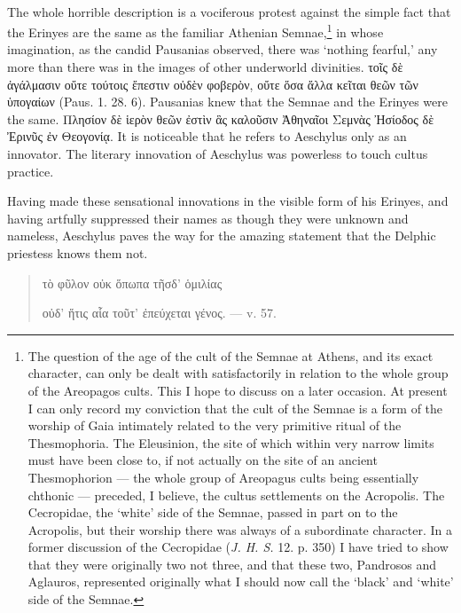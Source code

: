 \documentclass[a4paper, 11pt, oneside, polutonikogreek, english]{article}
\begin{document}
\paragraph{}
The whole horrible description is a vociferous protest against the simple fact that the Erinyes are the same as the familiar Athenian Semnae,\footnote{The question of the age of the cult of the Semnae at Athens, and its exact character, can only be dealt with satisfactorily in relation to the whole group of the Areopagos cults. This I hope to discuss on a later occasion. At present I can only record my conviction that the cult of the Semnae is a form of the worship of Gaia intimately related to the very primitive ritual of the Thesmophoria. The Eleusinion, the site of which within very narrow limits must have been close to, if not actually on the site of an ancient Thesmophorion --- the whole group of Areopagus cults being essentially chthonic --- preceded, I believe, the cultus settlements on the Acropolis. The Cecropidae, the `white' side of the Semnae, passed in part on to the Acropolis, but their worship there was always of a subordinate character. In a former discussion of the Cecropidae (\emph{J. H. S.} 12. p. 350) I have tried to show that they were originally two not three, and that these two, Pandrosos and Aglauros, represented originally what I should now call the `black' and `white' side of the Semnae.} in whose imagination, as the candid Pausanias observed, there was `nothing fearful,' any more than there was in the images of other underworld divinities. τοῖς δὲ ἀγάλμασιν οὔτε τούτοις ἔπεστιν οὐδὲν φοβερὸν, οὔτε ὅσα ἄλλα κεῖται θεῶν τῶν ὑπογαίων (Paus. 1. 28. 6). Pausanias knew that the Semnae and the Erinyes were the same. Πλησίον δὲ ἱερὸν θεῶν ἐστὶν ἃς καλοῦσιν Ἀθηναῖοι Σεμνὰς Ἠσίοδος δὲ Ἐρινῦς ἐν Θεογονίᾳ. It is noticeable that he refers to Aeschylus only as an innovator. The literary innovation of Aeschylus was powerless to touch cultus practice.

Having made these sensational innovations in the visible form of his Erinyes, and having artfully suppressed their names as though they were unknown and nameless, Aeschylus paves the way for the amazing statement that the Delphic priestess knows them not.
\begin{quotation}
\large
τὸ φῦλον οὐκ ὅπωπα τῆσδ' ὁμιλίας

οὐδ' ἥτις αἷα τοῦτ' ἐπεύχεται γένος. --- v. 57.
\end{quotation}
\end{document}
